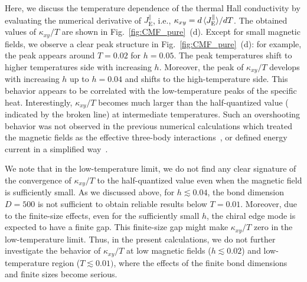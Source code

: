 \documentclass[twocolumn,superscriptaddress,showpacs, longbibliography, aps, prb]{revtex4-2}
\newcommand{\red}[1]{\textcolor{red}{#1}}
\newcommand{\blue}[1]{\textcolor{blue}{#1}}
\newcommand{\orange}[1]{\textcolor{orange}{#1}}
\begin{document}
Here, we discuss the temperature dependence of the thermal Hall conductivity
by evaluating %
the numerical derivative of {$J_{\mathrm{E}}^{\parallel}$}, i.e., $\kappa_{xy}=d {\ev*{J_{\mathrm{E}}^{\parallel}}}/dT$.
The obtained values of  %
$\kappa_{xy}/T$ are shown in Fig.~\ref{fig:CMF_pure}~(d). 
Except for small magnetic fields, we %
observe a clear peak structure in Fig.~\ref{fig:CMF_pure}~(d): for example,
the peak appears around $T=0.02$ for $h=0.05$. 
The peak temperatures %
shift to %
higher temperatures side with increasing %
$h$.
Moreover, the peak of $\kappa_{xy}/T$ develops with increasing $h$ up to $h=0.04$ and shifts to the high-temperature side.
This behavior appears to be correlated with the low-temperature peaks of the specific heat. 
Interestingly, $\kappa_{xy}/T$ becomes much larger than the half-quantized value (%
indicated by the broken line) 
at intermediate temperatures. 
Such an overshooting behavior was not observed in the previous numerical calculations %
which 
treated the magnetic fields as the effective three-body interactions~\cite{NasuYM2017}, or defined energy current in a simplified way~\cite{KumarT2023}. %

We note that in the low-temperature limit, we do not find any clear signature of the 
convergence of $\kappa_{xy}/T$ to the half-quantized value even when the magnetic field is sufficiently small.
As we discussed above, for $h\lesssim0.04$, the bond dimension $D=500$ is not sufficient
to obtain reliable results below $T=0.01$.
Moreover, due to the finite-size effects, %
even for the sufficiently small $h$, 
the %
chiral edge mode %
is expected to have a finite gap.
This finite-size gap might make $\kappa_{xy}/T$ zero in the low-temperature limit.
Thus, in the present calculations, 
we do not %
further investigate the behavior %
of $\kappa_{xy}/T$ at low magnetic fields ($h\lesssim0.02$) and low-temperature region ($T\lesssim 0.01)$,%
where the effects of the finite bond dimensions and finite sizes become serious.
\end{document}
